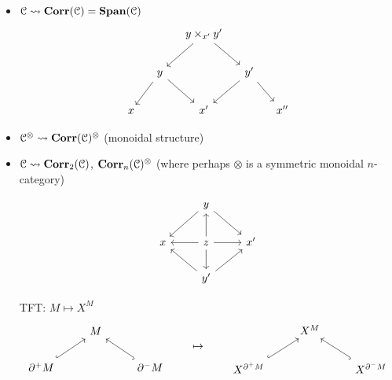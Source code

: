 \documentclass[main.tex]{subfiles}
\begin{document}
\begin{itemize}
  \item $\mathcal{C} \rightsquigarrow \mathbf{Corr}(\mathcal{C}) = \mathbf{Span}(\mathcal{C})$
    \begin{equation*}
      \begin{tikzcd}[column sep=small]
        && y \times_{x'} y'
        \arrow[dr]
        \arrow[dl]
        \\
        & y
        \arrow[dr]
        \arrow[dl]
        && y'
        \arrow[dr]
        \arrow[dl]
        \\
        x
        && x'
        && x''
      \end{tikzcd}
    \end{equation*}

  \item $\mathcal{C}^{\otimes} \rightsquigarrow \mathbf{Corr}(\mathcal{C})^{\otimes}$ (monoidal structure)

  \item $\mathcal{C} \rightsquigarrow \mathbf{Corr}_{2}(\mathcal{C})$, $\mathbf{Corr}_{n}(\mathcal{C})^{\otimes}$ (where perhaps $\otimes$ is a symmetric monoidal $n$-category)

    \begin{equation*}
      \begin{tikzcd}
        & y
        \arrow[dl]
        \arrow[dr]
        \\
        x
        & z
        \arrow[u]
        \arrow[r]
        \arrow[d]
        \arrow[l]
        & x'
        \\
        & y'
        \arrow[ul]
        \arrow[ur]
      \end{tikzcd}
    \end{equation*}

    TFT: $M \mapsto X^{M}$
    \begin{equation*}
      \begin{tikzcd}
        & M
        \\
        \partial^{+}M
        \arrow[ur, hook]
        && \partial^{-}M
        \arrow[ul, hook]
      \end{tikzcd}
      \qquad\mapsto\qquad
      \begin{tikzcd}
        & X^{M}
        \\
        X^{\partial^{+}M}
        \arrow[ur, hook]
        && X^{\partial^{-}M}
        \arrow[ul, hook]
      \end{tikzcd}
    \end{equation*}
\end{itemize}
\end{document}
